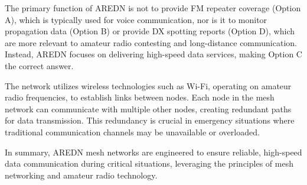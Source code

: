 The primary function of AREDN is not to provide FM repeater coverage (Option A), which is typically used for voice communication, nor is it to monitor propagation data (Option B) or provide DX spotting reports (Option D), which are more relevant to amateur radio contesting and long-distance communication. Instead, AREDN focuses on delivering high-speed data services, making Option C the correct answer.

The network utilizes wireless technologies such as Wi-Fi, operating on amateur radio frequencies, to establish links between nodes. Each node in the mesh network can communicate with multiple other nodes, creating redundant paths for data transmission. This redundancy is crucial in emergency situations where traditional communication channels may be unavailable or overloaded.

In summary, AREDN mesh networks are engineered to ensure reliable, high-speed data communication during critical situations, leveraging the principles of mesh networking and amateur radio technology.

